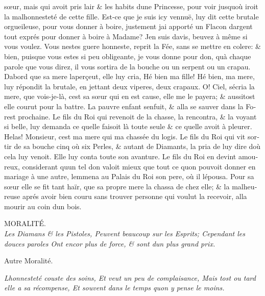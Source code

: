 \documentclass[14pt,a4paper]{memoir}
\begin{document}
\begin{otherlanguage}{french}
sœur, mais qui avoit pris l\textquotesingle air \& les habits
d\textquotesingle une Princesse, pour voir jusqu\textquotesingle où
iroit la malhonnesteté de cette fille. Est-ce que je suis icy vennuë,
luy dit cette brutale orgueileuse, pour vous donner à boire, justement
j\textquotesingle ai apporté un Flacon d\textquotesingle argent tout
exprés pour donner à boire à Madame? J\textquotesingle en suis
d\textquotesingle avis, beuvez à même si vous voulez. Vous
n\textquotesingle estes guere honneste, reprit la Fée, sans se mettre en
colere: \& bien, puisque vous estes si peu obligeante, je vous donne
pour don, qu\textquotesingle à chaque parole que vous direz, il vous
sortira de la bouche ou un serpent ou un crapau. D\textquotesingle abord
que sa mere l\textquotesingle aperçeut, elle luy cria, Hé bien ma fille!
Hé bien, ma mere, luy répondit la brutale, en jettant deux viperes, deux
crapaux. O! Ciel, s\textquotesingle écria la mere, que vois-je-là,
c\textquotesingle est sa sœur qui en est cause, elle me le payera; \&
aussitost elle courut pour la battre. La pauvre enfant
s\textquotesingle enfuit, \& alla se sauver dans la Forest prochaine. Le
fils du Roi qui revenoit de la chasse, la rencontra, \& la voyant si
belle, luy demanda ce qu\textquotesingle elle faisoit là toute seule \&
ce qu\textquotesingle elle avoit à pleurer. Helas! Monsieur,
c\textquotesingle est ma mere qui m\textquotesingle a chassée du logis.
Le fils du Roi qui vit sortir de sa bouche cinq où six Perles, \& autant
de Diamants, la pria de luy dire d\textquotesingle où cela luy venoit.
Elle luy conta toute son avanture. Le fils du Roi en devint amoureux,
considerant qu\textquotesingle un tel don valoit mieux que tout ce
qu\textquotesingle on pouvoit donner en mariage à une autre,
l\textquotesingle emmena au Palais du Roi son pere, où il
l\textquotesingle épousa. Pour sa sœur elle se fit tant haïr, que sa
propre mere la chassa de chez elle; \& la malheureuse aprés avoir bien
couru sans trouver personne qui voulut la recevoir, alla mourir au coin
d\textquotesingle un bois.

MORALITÉ. \\

\emph{{Les Diamans \& les Pistoles,} {Peuvent beaucoup sur les Esprits;}
{Cependant les douces paroles} {Ont encor plus de force, \& sont
d\textquotesingle un plus grand prix.}}

Autre Moralité.

\emph{{L\textquotesingle honnesteté couste des soins,} {Et veut un peu
de complaisance,} {Mais tost ou tard elle a sa récompense,} {Et souvent
dans le temps qu\textquotesingle on y pense le moins.}}


\end{otherlanguage}
\end{document}
